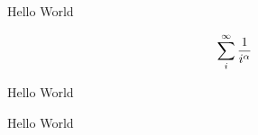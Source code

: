 

\largesans

\begingroup\color{white}
\vfill
\centerline{Hello World}
$$\sum_i^\infty {1 \over i^\alpha}$$
\centerline{Hello World}
\vfill
\eject

\vfill
\centerline{\begingroup\color{green} \hugeti Hello World\endgroup}
\endgroup %
\bye
